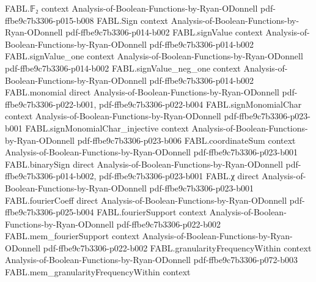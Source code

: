 \begin{theorem}
\label{FABL.exists_DNF_of_decisionTree}
\leanok
{}
\proofstep
  {FABL.𝔽₂}
  {context}
  {Analysis-of-Boolean-Functions-by-Ryan-ODonnell}
  {pdf-ffbe9c7b3306-p015-b008}
\proofstep
  {FABL.Sign}
  {context}
  {Analysis-of-Boolean-Functions-by-Ryan-ODonnell}
  {pdf-ffbe9c7b3306-p014-b002}
\proofstep
  {FABL.signValue}
  {context}
  {Analysis-of-Boolean-Functions-by-Ryan-ODonnell}
  {pdf-ffbe9c7b3306-p014-b002}
\proofstep
  {FABL.signValue_one}
  {context}
  {Analysis-of-Boolean-Functions-by-Ryan-ODonnell}
  {pdf-ffbe9c7b3306-p014-b002}
\proofstep
  {FABL.signValue_neg_one}
  {context}
  {Analysis-of-Boolean-Functions-by-Ryan-ODonnell}
  {pdf-ffbe9c7b3306-p014-b002}
\proofstep
  {FABL.monomial}
  {direct}
  {Analysis-of-Boolean-Functions-by-Ryan-ODonnell}
  {pdf-ffbe9c7b3306-p022-b001,
    pdf-ffbe9c7b3306-p022-b004}
\proofstep
  {FABL.signMonomialChar}
  {context}
  {Analysis-of-Boolean-Functions-by-Ryan-ODonnell}
  {pdf-ffbe9c7b3306-p023-b001}
\proofstep
  {FABL.signMonomialChar_injective}
  {context}
  {Analysis-of-Boolean-Functions-by-Ryan-ODonnell}
  {pdf-ffbe9c7b3306-p023-b006}
\proofstep
  {FABL.coordinateSum}
  {context}
  {Analysis-of-Boolean-Functions-by-Ryan-ODonnell}
  {pdf-ffbe9c7b3306-p023-b001}
\proofstep
  {FABL.binarySign}
  {direct}
  {Analysis-of-Boolean-Functions-by-Ryan-ODonnell}
  {pdf-ffbe9c7b3306-p014-b002,
    pdf-ffbe9c7b3306-p023-b001}
\proofstep
  {FABL.χ}
  {direct}
  {Analysis-of-Boolean-Functions-by-Ryan-ODonnell}
  {pdf-ffbe9c7b3306-p023-b001}
\proofstep
  {FABL.fourierCoeff}
  {direct}
  {Analysis-of-Boolean-Functions-by-Ryan-ODonnell}
  {pdf-ffbe9c7b3306-p025-b004}
\proofstep
  {FABL.fourierSupport}
  {context}
  {Analysis-of-Boolean-Functions-by-Ryan-ODonnell}
  {pdf-ffbe9c7b3306-p022-b002}
\proofstep
  {FABL.mem_fourierSupport}
  {context}
  {Analysis-of-Boolean-Functions-by-Ryan-ODonnell}
  {pdf-ffbe9c7b3306-p022-b002}
\proofstep
  {FABL.granularityFrequencyWithin}
  {context}
  {Analysis-of-Boolean-Functions-by-Ryan-ODonnell}
  {pdf-ffbe9c7b3306-p072-b003}
\proofstep
  {FABL.mem_granularityFrequencyWithin}
  {context}

\end{theorem}
